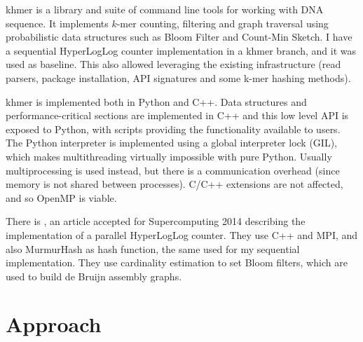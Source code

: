 \documentclass{bioinfo}
\begin{document}
khmer is a library and suite of command line tools for working with DNA sequence.
It implements $k$-mer counting, filtering and graph traversal using
probabilistic data structures such as Bloom Filter and Count-Min Sketch.
I have a sequential HyperLogLog counter implementation in a khmer branch,
and it was used as baseline.
This also allowed leveraging the existing infrastructure (read parsers,
package installation,
API signatures and some k-mer hashing methods).

khmer is implemented both in Python and C++.
Data structures and performance-critical sections are implemented in C++ and this low level API is exposed to Python,
with scripts providing the functionality available to users.
The Python interpreter is implemented using a global interpreter lock (GIL),
which makes multithreading virtually impossible with pure Python.
Usually multiprocessing is used instead,
but there is a communication overhead (since memory is not shared between processes).
C/C++ extensions are not affected,
and so OpenMP is viable.

There is \citep{georganas2014parallel}, an article accepted for Supercomputing 2014 describing the implementation of a parallel HyperLogLog counter.
They use C++ and MPI,
and also MurmurHash as hash function,
the same used for my sequential implementation.
They use cardinality estimation to set Bloom filters,
which are used to build de Bruijn assembly graphs.






\section{Approach}
\end{document}
